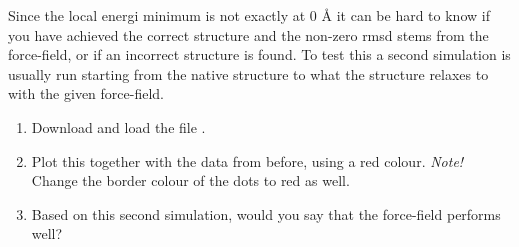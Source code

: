 \documentclass{article}
\begin{document}
Since the local energi minimum is not exactly at 0 Å it can be hard to know if you have achieved the correct structure and the non-zero rmsd stems from the force-field, or if an incorrect structure is found.
To test this a second simulation is usually run starting from the native structure to what the structure relaxes to with the given force-field.


\begin{enumerate}[resume]

    \item Download and load the file .

    \item Plot this together with the data from before, using a red colour. \emph{Note!} Change the border colour of the dots to red as well.

    \item Based on this second simulation, would you say that the force-field performs well?

\end{enumerate}

\end{document}
